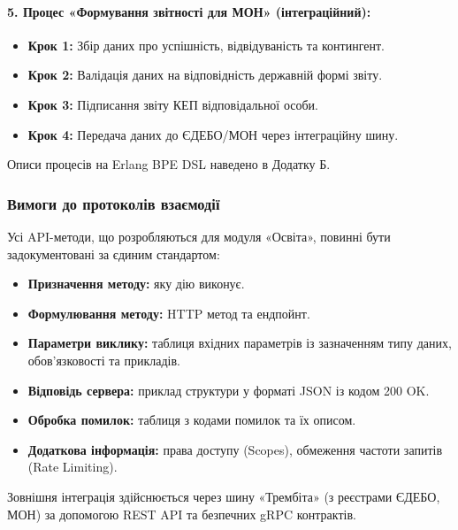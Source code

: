 \documentclass{article}
\begin{document}
\paragraph{5. Процес «Формування звітності для МОН» (інтеграційний):}
\begin{itemize}
    \item \textbf{Крок 1:} Збір даних про успішність, відвідуваність та контингент.
    \item \textbf{Крок 2:} Валідація даних на відповідність державній формі звіту.
    \item \textbf{Крок 3:} Підписання звіту КЕП відповідальної особи.
    \item \textbf{Крок 4:} Передача даних до ЄДЕБО/МОН через інтеграційну шину.
\end{itemize}
Описи процесів на Erlang BPE DSL наведено в Додатку Б.

\subsubsection{Вимоги до протоколів взаємодії}
Усі API-методи, що розробляються для модуля «Освіта», повинні бути задокументовані за єдиним стандартом:
\begin{itemize}
    \item \textbf{Призначення методу:} яку дію виконує.
    \item \textbf{Формулювання методу:} HTTP метод та ендпойнт.
    \item \textbf{Параметри виклику:} таблиця вхідних параметрів із зазначенням типу даних, обов'язковості та прикладів.
    \item \textbf{Відповідь сервера:} приклад структури у форматі JSON із кодом 200 OK.
    \item \textbf{Обробка помилок:} таблиця з кодами помилок та їх описом.
    \item \textbf{Додаткова інформація:} права доступу (Scopes), обмеження частоти запитів (Rate Limiting).
\end{itemize}
Зовнішня інтеграція здійснюється через шину «Трембіта» (з реєстрами ЄДЕБО, МОН) за допомогою REST API та безпечних gRPC контрактів.
\end{document}
